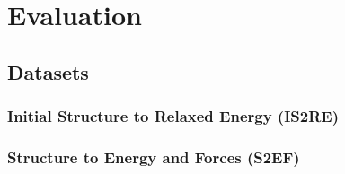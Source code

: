 \section{Evaluation}

\subsection{Datasets}

\subsubsection{Initial Structure to Relaxed Energy (IS2RE)}



\subsubsection{Structure to Energy and Forces (S2EF)}


